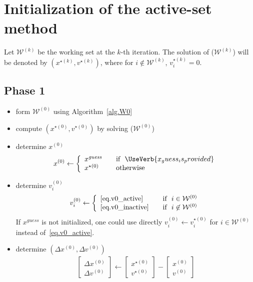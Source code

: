 \documentclass[12pt,a4paper]{article}
\begin{document}
\clearpage

\section{Initialization of the active-set method}

Let $\mathcal{W}^{(k)}$ be the working set at the $k$-th iteration. The solution of
($\mathcal{W}^{(k)}$) will be denoted by $(x^{\star(k)},v^{\star(k)})$, where for
$i\not\in \mathcal{W}^{(k)}$, $v_i^{\star(k)} = 0$.

\subsection{Phase 1}

\begin{itemize}
\item form $\mathcal{W}^{(0)}$ using Algorithm~\ref{alg.W0}
\item compute $(x^{\star(0)},v^{\star(0)})$ by solving ($\mathcal{W}^{(0)}$)
\item determine $x^{(0)}$
    \begin{align*}
      x^{(0)} \leftarrow \left\{ 
      \begin{array}{l l}
        x^{\mathit{guess}} & \quad \text{if} \,\,\,\, \UseVerb{x_guess_is_provided} \\
        x^{\star(0)} & \quad \text{otherwise}
      \end{array} \right.
    \end{align*}

\item determine $v_i^{(0)}$
%
    \begin{align*}
      v_i^{(0)} \leftarrow \left\{ 
      \begin{array}{l l}
        \eqref{eq.v0_active} & \quad \text{if} \,\,\,\, i\in\mathcal{W}^{(0)} \\
        \eqref{eq.v0_inactive} & \quad \text{if} \,\,\,\, i\not\in\mathcal{W}^{(0)}
      \end{array} \right.
    \end{align*}
    If $x^{\mathit{guess}}$ is not initialized, one could use directly $v_i^{(0)} \leftarrow v_i^{\star(0)}$
    for $i\in\mathcal{W}^{(0)}$ instead of~\eqref{eq.v0_active}.

\item determine $(\Delta x^{(0)},\Delta  v^{(0)})$
%
  \begin{align*}
    \begin{bmatrix}\Delta x^{(0)} \\ \Delta v^{(0)}\end{bmatrix} \leftarrow
    \begin{bmatrix}x^{\star(0)} \\ v^{\star(0)}\end{bmatrix} - 
    \begin{bmatrix}x^{(0)} \\ v^{(0)}\end{bmatrix}
  \end{align*}


\end{itemize}
\end{document}

